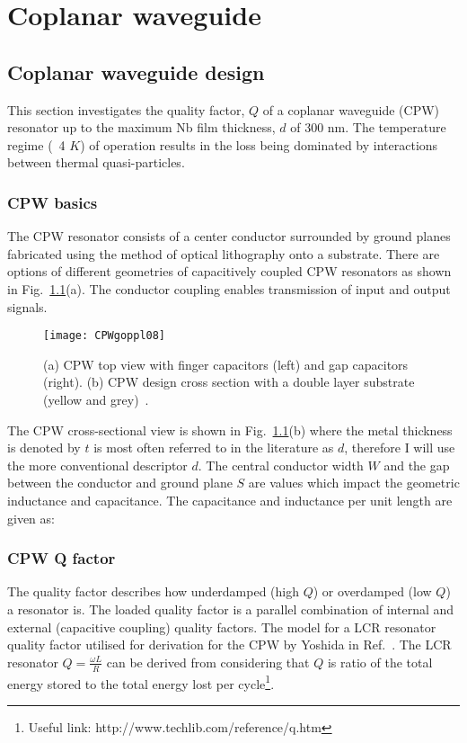 \chapter{Coplanar waveguide}
\section{\label{sec:Coplanar Waveguide Design}Coplanar waveguide design}
This section investigates the quality factor, $Q$ of a coplanar waveguide (CPW) resonator up to the maximum Nb film thickness, $d$ of 300 nm. The temperature regime (~4 $K$) of operation results in the loss being dominated by interactions between thermal quasi-particles.      

\subsection{CPW basics}

\noindent The CPW resonator consists of a center conductor surrounded by ground planes fabricated using the method of optical lithography onto a substrate. There are options of different geometries of capacitively coupled CPW resonators as shown in Fig.~\ref{fig:CPWgoppl08}(a). The conductor coupling enables transmission of input and output signals.

\begin{figure}[h]
\centering
\texttt{[image: CPWgoppl08]}
\caption{\label{fig:CPWgoppl08} (a) CPW top view with finger capacitors (left) and gap capacitors (right). (b) CPW design cross section with a double layer substrate (yellow and grey)~\citep{doi:10.1063/1.3010859}.}
\end{figure}

The CPW cross-sectional view is shown in Fig.~\ref{fig:CPWgoppl08}(b) where the metal thickness is denoted by $t$ is most often referred to in the literature as $d$, therefore I will use the more conventional descriptor $d$. The central conductor width $W$ and the gap between the conductor and ground plane $S$ are values which impact the geometric inductance and capacitance. The capacitance and inductance per unit length are given as:

  

\subsection{CPW Q factor}
The quality factor describes how underdamped (high $Q$) or overdamped (low $Q$) a resonator is. The loaded quality factor is a parallel combination of internal and external (capacitive coupling) quality factors. The model for a LCR resonator quality factor utilised for derivation for the CPW by Yoshida in Ref.~\citep{402973}. The LCR resonator $Q= \frac{\omega L}{R}$ can be derived from considering that $Q$ is ratio of the total energy stored to the total energy lost per cycle\footnote{Useful link: http://www.techlib.com/reference/q.htm}. 

